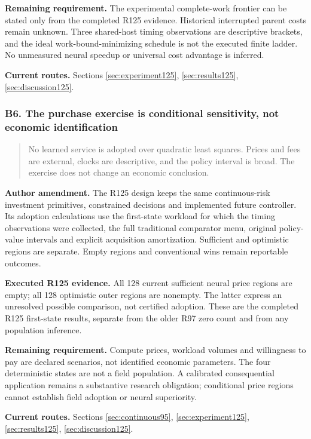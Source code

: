 \noindent\textbf{Remaining requirement.} The experimental complete-work frontier can be stated only from the completed R125 evidence. Historical interrupted parent costs remain unknown. Three shared-host timing observations are descriptive brackets, and the ideal work-bound-minimizing schedule is not the executed finite ladder. No unmeasured neural speedup or universal cost advantage is inferred.

\noindent\textbf{Current routes.} Sections \ref{sec:experiment125}, \ref{sec:results125}, \ref{sec:discussion125}.

\subsubsection{B6. The purchase exercise is conditional sensitivity, not economic identification}

\begin{quote}\small
No learned service is adopted over quadratic least squares. Prices and fees are external, clocks are descriptive, and the policy interval is broad. The exercise does not change an economic conclusion.
\end{quote}

\noindent\textbf{Author amendment.} The R125 design keeps the same continuous-risk investment primitives, constrained decisions and implemented future controller. Its adoption calculations use the first-state workload for which the timing observations were collected, the full traditional comparator menu, original policy-value intervals and explicit acquisition amortization. Sufficient and optimistic regions are separate. Empty regions and conventional wins remain reportable outcomes.

\noindent\textbf{Executed R125 evidence.} All 128 current sufficient neural price regions are empty; all 128 optimistic outer regions are nonempty. The latter express an unresolved possible comparison, not certified adoption. These are the completed R125 first-state results, separate from the older R97 zero count and from any population inference.

\noindent\textbf{Remaining requirement.} Compute prices, workload volumes and willingness to pay are declared scenarios, not identified economic parameters. The four deterministic states are not a field population. A calibrated consequential application remains a substantive research obligation; conditional price regions cannot establish field adoption or neural superiority.

\noindent\textbf{Current routes.} Sections \ref{sec:continuous95}, \ref{sec:experiment125}, \ref{sec:results125}, \ref{sec:discussion125}.

